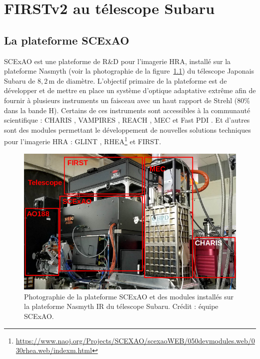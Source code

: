 \chapter{FIRSTv2 au télescope Subaru}
\label{sec:FIRSTv2Subaru}
\setcounter{figure}{0}
\setcounter{table}{0}
\setcounter{equation}{0}

\minitoc

\clearpage
\section{La plateforme SCExAO}

\acrfull{SCExAO} \citep{jovanovic2015} est une plateforme de R\&D pour l'imagerie \acrfull{HRA}, installé sur la plateforme Nasmyth (voir la photographie de la figure~\ref{fig:SCExAOPhoto}) du télescope Japonais Subaru de $8,2 \,$m de diamètre. L'objectif primaire de la plateforme est de développer et de mettre en place un système d'optique adaptative extrême afin de fournir à plusieurs instruments un faisceau avec un haut rapport de Strehl ($80 \%$ dans la bande H). Certains de ces instruments sont accessibles à la communauté scientifique : \acrfull{CHARIS} \citep{groff2015}, \acrfull{VAMPIRES} \citep{norris2015}, \acrfull{REACH} \citep{kotani2018}, \acrfull{MEC} \citep{walter2020} et Fast \acrfull{PDI} \citep{lozi2020}. Et d'autres sont des modules permettant le développement de nouvelles solutions techniques pour l'imagerie \ac{HRA} : \ac{GLINT} \citep{norris2020b}, \ac{RHEA}\footnote{\url{https://www.naoj.org/Projects/SCEXAO/scexaoWEB/050devmodules.web/030rhea.web/indexm.html}} et \ac{FIRST}.

\begin{figure}[ht!]
    \centering
    \includegraphics[width=\figwidth]{Figure_Chap5/SCExAO_onNasIR_label.png}
    \caption[Photographie de la plateforme SCExAO et des modules installés sur la plateforme Nasmyth IR du télescope Subaru.]{Photographie de la plateforme SCExAO et des modules installés sur la plateforme Nasmyth IR du télescope Subaru. Crédit : équipe SCExAO.}
    \label{fig:SCExAOPhoto}
\end{figure}

